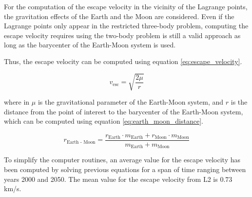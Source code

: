 For the computation of the escape velocity in the vicinity of the Lagrange
points, the gravitation effects of the Earth and the Moon are considered. Even
if the Lagrange points only appear in the restricted three-body problem,
computing the escape velocity requires using the two-body problem is still a
valid approach as long as the barycenter of the Earth-Moon system is used.

Thus, the escape velocity can be computed using equation \ref{eq:escape_velocity}.

\begin{equation}
        v_{\text{esc}} = \sqrt{\frac{2 \mu}{r}}
\label{eq:escape_velocity}
\end{equation}

where in $\mu$ is the gravitational parameter of the Earth-Moon system, and $r$
is the distance from the point of interest to the barycenter of the Earth-Moon
system, which can be computed using equation \ref{eq:earth_moon_distance}.

\begin{equation}
    r_{\text{Earth - Moon}} = \frac{r_{\text{Earth}} \cdot m_{\text{Earth}} + r_{\text{Moon}} \cdot m_{\text{Moon}}}{m_{\text{Earth}} + m_{\text{Moon}}}
    \label{eq:earth_moon_distance}
\end{equation}

To simplify the computer routines, an average value for the escape velocity has
been computed by solving previous equations for a span of time ranging between
years 2000 and 2050. The mean value for the escape velocity from L2 is $0.73$
km/s.
